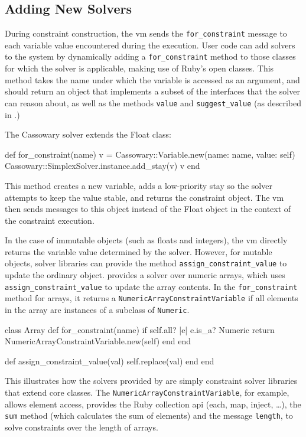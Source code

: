 \subsection{Adding New Solvers}
\label{sec:solver-interface}
During constraint construction, the \ac{vm} sends the
\lstinline{for_constraint} message to each variable value encountered during
the execution. User code can add solvers to the system by dynamically
adding a \lstinline{for_constraint} method to those classes for which the
solver is applicable, making use of Ruby's open classes. This method
takes the name under which the variable is accessed as an argument,
and should return an object that implements a subset of the interfaces
that the solver can reason about, as well as the methods
\lstinline{value} and \lstinline{suggest_value} (as described in
.)

The Cassowary solver extends the Float class:
\begin{code}
  def for_constraint(name)
    v = Cassowary::Variable.new(name: name, value: self)
    Cassowary::SimplexSolver.instance.add_stay(v)
    v
  end
\end{code}

This method creates a new variable, adds a low-priority stay so the
solver attempts to keep the value stable, and returns the constraint
object. The \ac{vm} then sends messages to this object instead of the
Float object in the context of the constraint execution.

In the case of immutable objects (such as floats and integers), the
\ac{vm} directly returns the variable value determined by the solver.
However, for mutable objects, solver libraries can provide
the method \lstinline{assign_constraint_value} to update the ordinary
object. \toolname provides a solver over numeric arrays, which uses
\lstinline{assign_constraint_value} to update the array contents. In
the \lstinline{for_constraint} method for arrays, it returns a
\lstinline{NumericArrayConstraintVariable} if all elements in the
array are instances of a subclass of \lstinline{Numeric}.
\begin{code}
class Array
  def for_constraint(name)
    if self.all? { |e| e.is_a? Numeric }
      return NumericArrayConstraintVariable.new(self)
    end
  end

  def assign_constraint_value(val)
    self.replace(val)
  end
end
\end{code}

This illustrates how the solvers provided by \toolname are simply
constraint solver libraries that extend core classes. The
\lstinline{NumericArrayConstraintVariable}, for example, allows
element access, provides the Ruby collection \ac{api} (each, map,
inject, \dots), the \lstinline{sum} method (which calculates the sum
of elements) and the message \lstinline{length}, to solve constraints
over the length of arrays.

